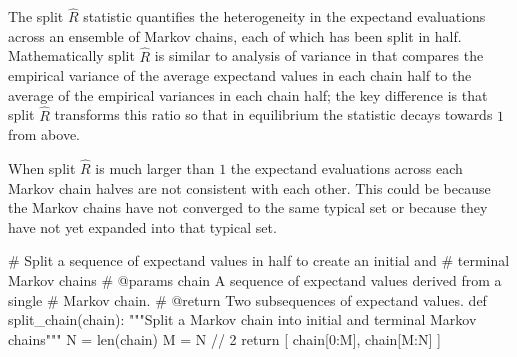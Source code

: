 \documentclass[
  letterpaper,
  DIV=11,
  numbers=noendperiod]{scrartcl}
\newenvironment{Shaded}{\begin{snugshade}}{\end{snugshade}}
\newcommand{\BuiltInTok}[1]{\textcolor[rgb]{0.00,0.23,0.31}{#1}}
\newcommand{\CommentTok}[1]{\textcolor[rgb]{0.37,0.37,0.37}{#1}}
\newcommand{\ControlFlowTok}[1]{\textcolor[rgb]{0.00,0.23,0.31}{#1}}
\newcommand{\DecValTok}[1]{\textcolor[rgb]{0.68,0.00,0.00}{#1}}
\newcommand{\KeywordTok}[1]{\textcolor[rgb]{0.00,0.23,0.31}{#1}}
\newcommand{\NormalTok}[1]{\textcolor[rgb]{0.00,0.23,0.31}{#1}}
\newcommand{\OperatorTok}[1]{\textcolor[rgb]{0.37,0.37,0.37}{#1}}
\begin{document}
The split \(\hat{R}\) statistic quantifies the heterogeneity in the
expectand evaluations across an ensemble of Markov chains, each of which
has been split in half. Mathematically split \(\hat{R}\) is similar to
analysis of variance in that compares the empirical variance of the
average expectand values in each chain half to the average of the
empirical variances in each chain half; the key difference is that split
\(\hat{R}\) transforms this ratio so that in equilibrium the statistic
decays towards \(1\) from above.

When split \(\hat{R}\) is much larger than \(1\) the expectand
evaluations across each Markov chain halves are not consistent with each
other. This could be because the Markov chains have not converged to the
same typical set or because they have not yet expanded into that typical
set.

\begin{Shaded}
\begin{Highlighting}[]
\CommentTok{\# Split a sequence of expectand values in half to create an initial and}
\CommentTok{\# terminal Markov chains}
\CommentTok{\# @params chain A sequence of expectand values derived from a single}
\CommentTok{\#               Markov chain.}
\CommentTok{\# @return Two subsequences of expectand values.}
\KeywordTok{def}\NormalTok{ split\_chain(chain):}
  \CommentTok{"""Split a Markov chain into initial and terminal Markov chains"""}
\NormalTok{  N }\OperatorTok{=} \BuiltInTok{len}\NormalTok{(chain)}
\NormalTok{  M }\OperatorTok{=}\NormalTok{ N }\OperatorTok{//} \DecValTok{2}
  \ControlFlowTok{return}\NormalTok{ [ chain[}\DecValTok{0}\NormalTok{:M], chain[M:N] ]}
\end{Highlighting}
\end{Shaded}
\end{document}
